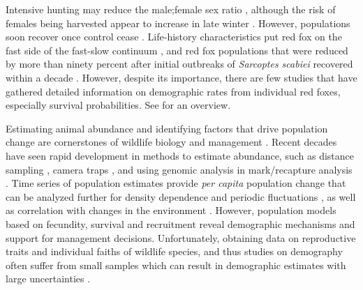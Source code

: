Intensive hunting may reduce the male;female sex ratio \citep{yonedaEffectsHuntingAge1982,gortazarHabitatRelatedDifferences2003}, although the risk of females being harvested appear to increase in late winter \citep{goszczynskiPopulationDynamicsRed1989,galbyMoreFemaleRed2010}. However, populations soon recover once control cease \citep{newsomeRapidRecolonisationEuropean2014}.  Life-history characteristics put red fox on the fast side of the fast-slow continuum \citep{heppellLifeHistoriesElasticity2000}, and red fox populations that were reduced by more than ninety percent after initial outbreaks of \emph{Sarcoptes scabiei} recovered within a decade  \citep{soulsbury2007impact,willebrandDecliningSurvivalRates2022}. However, despite its importance, there are few studies that have gathered detailed information on demographic rates from individual red foxes, especially survival probabilities. See \citet{devenish-nelsonDemographyCarnivoreRed2013} for an overview.



Estimating animal abundance and identifying factors that drive population change are cornerstones of wildlife biology and management \citep{saetherHowLifeHistory2013,eberhardtParadigmPopulationAnalysis2002}.  Recent decades have seen rapid development in methods to estimate abundance, such as distance sampling \citep{bucklandDistanceSamplingEstimating1993}, camera traps \citep{burtonREVIEWWildlifeCamera2015}, and using genomic analysis in mark/recapture analysis \citep{lukacsReviewCaptureRecapture2005,bravingtonCloseKinMarkRecapture2016}. Time series of population estimates provide \emph{per capita} population change that can be analyzed further for density dependence and periodic fluctuations \citep{royama1992analytical,turchin2013complex}, as well as correlation with changes in the environment \citep{markovchick-nichollsRelationshipsHumanDisturbance2008,knapeEffectsWeatherClimate2011}. However, population models based on fecundity, survival and recruitment reveal demographic mechanisms and support for management decisions\citep{lebretonDetectingEstimatingDensity2013,gaillard2003variation,saetherAVIANLIFEHISTORY2000}. Unfortunately, obtaining data on reproductive traits and individual faiths of wildlife species, and thus studies on demography often suffer from small samples which can result in demographic estimates with large uncertainties \citep{doakUnderstandingPredictingEffects2005a,popescuAssessingBiologicalRealism2016}. 



